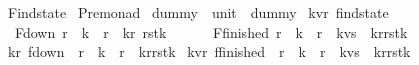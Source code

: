 %
\begin{isabellebody}%
%
%
\isadelimtheory
%
\endisadelimtheory
%
\isatagtheory
{}\isamarkupfalse%
\ Find{\isacharunderscore}state\isanewline
{}\ Pre{\isacharunderscore}monad\isanewline
{}%
\endisatagtheory
{\isafoldtheory}%
%
\isadelimtheory
\isanewline
%
\endisadelimtheory
\isanewline
\isanewline
\isanewline
{}\isamarkupfalse%
\ dummy\ {\isacharcolon}{\isacharcolon}\ {\isachardoublequoteopen}unit{\isachardoublequoteclose}\ \ {\isachardoublequoteopen}dummy{\isacharequal}{\isacharparenleft}{\isacharparenright}{\isachardoublequoteclose}\isanewline
\isanewline
\isanewline
\isanewline
\isanewline
\isanewline
\isanewline
\isanewline
\isanewline
{}\isamarkupfalse%
\ {\isacharparenleft}{\isacharprime}k{\isacharcomma}{\isacharprime}v{\isacharcomma}{\isacharprime}r{\isacharparenright}\ find{\isacharunderscore}state\ {\isacharequal}\ \isanewline
\ \ F{\isacharunderscore}down\ {\isachardoublequoteopen}{\isacharprime}r\ {\isacharasterisk}\ {\isacharprime}k\ {\isacharasterisk}\ {\isacharprime}r\ {\isacharasterisk}\ {\isacharparenleft}{\isacharprime}k{\isacharcomma}{\isacharprime}r{\isacharparenright}\ rstk{\isachardoublequoteclose}\ \ \ \isanewline
\ \ {\isacharbar}\ F{\isacharunderscore}finished\ {\isachardoublequoteopen}{\isacharprime}r\ {\isacharasterisk}\ {\isacharprime}k\ {\isacharasterisk}\ {\isacharprime}r\ {\isacharasterisk}\ {\isacharparenleft}{\isacharprime}k{\isacharasterisk}{\isacharprime}v{\isacharparenright}s\ {\isacharasterisk}\ {\isacharparenleft}{\isacharprime}k{\isacharcomma}{\isacharprime}r{\isacharparenright}rstk{\isachardoublequoteclose}\isanewline
\isanewline
\isanewline
\isanewline
{}\isamarkupfalse%
\ {\isacharparenleft}{\isacharprime}k{\isacharcomma}{\isacharprime}r{\isacharparenright}\ f{\isacharunderscore}down\ {\isacharequal}\ {\isachardoublequoteopen}{\isacharprime}r\ {\isacharasterisk}\ {\isacharprime}k\ {\isacharasterisk}\ {\isacharprime}r\ {\isacharasterisk}\ {\isacharparenleft}{\isacharprime}k{\isacharcomma}{\isacharprime}r{\isacharparenright}rstk{\isachardoublequoteclose}\isanewline
{}\isamarkupfalse%
\ {\isacharparenleft}{\isacharprime}k{\isacharcomma}{\isacharprime}v{\isacharcomma}{\isacharprime}r{\isacharparenright}\ f{\isacharunderscore}finished\ {\isacharequal}\ {\isachardoublequoteopen}{\isacharprime}r\ {\isacharasterisk}\ {\isacharprime}k\ {\isacharasterisk}\ {\isacharprime}r\ {\isacharasterisk}\ {\isacharparenleft}{\isacharprime}k{\isacharasterisk}{\isacharprime}v{\isacharparenright}s\ {\isacharasterisk}\ {\isacharparenleft}{\isacharprime}k{\isacharcomma}{\isacharprime}r{\isacharparenright}rstk{\isachardoublequoteclose}\isanewline

\end{isabellebody}
